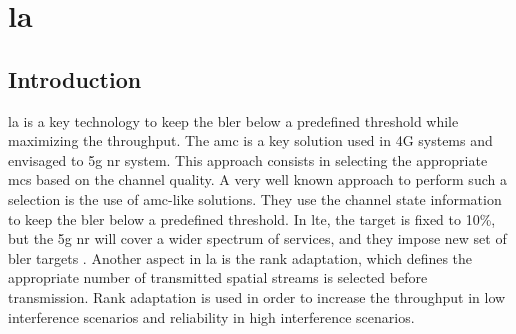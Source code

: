 \chapter{\Acl{la}} \label{chp:la}


\section{Introduction} \label{sec:la-intro}
\Gls{la} is a key technology to keep the \gls{bler} below a predefined threshold while maximizing the throughput.
%
The \gls{amc} is a key solution used in 4G systems and envisaged to \gls{5g} \gls{nr} system.
%
This approach consists in selecting the appropriate \gls{mcs} based on the channel quality.
%
A very well known approach to perform such a selection is the use of \gls{amc}-like solutions.
%
They use the channel state information to keep the \gls{bler} below a predefined threshold.
%
In \gls{lte}, the target is fixed to 10\%, but the \gls{5g} \gls{nr} will cover a wider spectrum of services, and they impose new set of \gls{bler} targets \cite{Amin_2016,fantacci2009adaptive}.
%
Another aspect in \gls{la} is the rank adaptation, which defines the appropriate number of transmitted spatial streams is selected before transmission.
%
Rank adaptation is used in order to increase the throughput in low interference scenarios and reliability in high interference scenarios.

%
%

